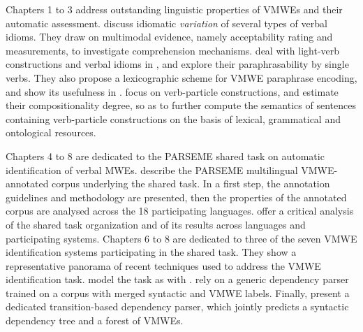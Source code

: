 \documentclass[output=paper,modfonts,]{langscibook}
\begin{document}
Chapters 1 %
to 3 %
address outstanding linguistic properties of VMWEs and their automatic assessment.   discuss idiomatic \emph{variation} of several types of  verbal idioms. They %
draw on multimodal evidence, namely acceptability rating and  measurements, to investigate comprehension mechanisms.  deal with light-verb constructions and verbal idioms in , and explore their paraphrasability by single verbs. They also propose a lexicographic scheme for VMWE paraphrase encoding, and show its usefulness in .   focus on  verb-particle constructions, and estimate their compositionality degree, so as to further compute the semantics of sentences containing verb-particle constructions %
on the basis of lexical, grammatical and ontological resources.

\newpage 
Chapters 4 %
to 8 %
are dedicated to the PARSEME shared task on automatic identification of verbal MWEs.  describe %
the PARSEME multilingual VMWE-annotated corpus underlying the shared task. In a first step, the annotation guidelines and methodology are presented, then 
the properties of the annotated corpus are analysed across the 18 participating languages.  offer a critical analysis of the shared task organization and of its results across languages and participating systems. Chapters 6 to 8 %
are dedicated to three of the seven %
VMWE identification systems participating in the shared task. They show a representative panorama of recent techniques used to address the VMWE identification task.   model the task as  with .   rely on a generic dependency parser trained on a corpus with merged syntactic and VMWE labels. Finally,  present a dedicated transition-based dependency parser, which jointly predicts a syntactic dependency tree and a forest of VMWEs. 
\end{document}
